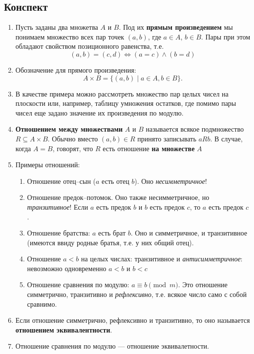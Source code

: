 

\subsection*{Конспект}
\begin{enumerate}
\item Пусть заданы два множетва $A$ и $B$. Под их \textbf{прямым произведением} мы понимаем множество всех пар точек $(a,b)$, где $a\in A$, $b\in B$. Пары при этом обладают свойством позиционного равенства, т.е.
$$
(a,b)=(c,d) \iff (a=c)\land (b=d)
$$
\item Обозначение для прямого произведения:
$$
A\times B = \{(a,b)\mid a\in A, b\in B\}.
$$
\item В качестве примера можно рассмотреть множество пар целых чисел на плоскости или, например, таблицу умножения остатков, где помимо пары чисел еще задано значение их произведения по модулю.
\item \textbf{Отношением между множествами} $A$ и $B$ называется всякое подмножество $R\subseteq A\times B$. Обычно вместо $(a,b)\in R$ принято записывать $aRb$. В случае, когда $A=B$, говорят, что $R$ есть отношение \textbf{на множестве} $A$
\item Примеры отношений:
\begin{enumerate}[R1]
\item Отношение отец--сын ($a$ есть отец $b$). Оно \textit{несимметричное}!
\item Отношение предок--потомок. Оно также несимметричное, но \textit{транзитивное}! Если $a$ есть предок $b$ и $b$ есть предок $c$, то $a$ есть предок $c$.
\item Отношение братства: $a$ есть брат $b$. Оно и симметричное, и транзитивное (имеются ввиду родные братья, т.е. у них общий отец).
\item Отношение $a<b$ на целых числах: транзитивное и \textit{антисимметричное}: невозможно одновременно $a<b$ и $b<c$
\item Отношение сравнения по модулю: $a\equiv b\pmod m$. Это отношение симметрично, транзитивно и \textit{рефлексивно}, т.е. всякое число само с собой сравнимо.
\end{enumerate}
\item Если отношение симметрично, рефлексивно и транзитивно, то оно называется \textbf{отношением эквивалентности}.
\item Отношение сравнения по модулю --- отношение эквивалетности.

\end{enumerate}

